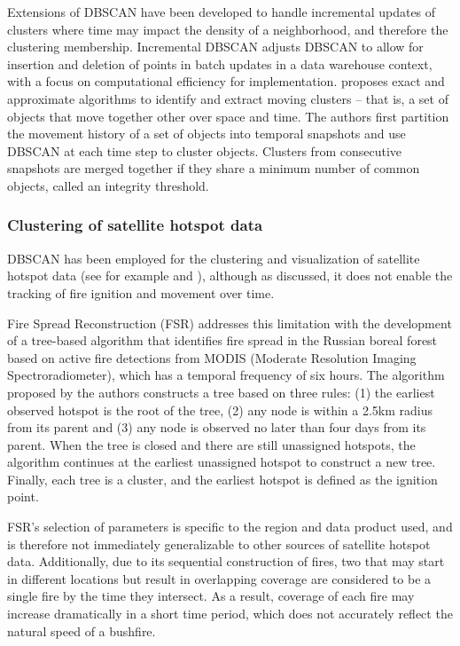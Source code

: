 Extensions of DBSCAN have been developed to handle incremental updates
of clusters where time may impact the density of a neighborhood, and
therefore the clustering membership. Incremental DBSCAN
\citep{ester1998incremental} adjusts DBSCAN to allow for insertion and
deletion of points in batch updates in a data warehouse context, with a
focus on computational efficiency for implementation. \citet{Kalnis2005}
proposes exact and approximate algorithms to identify and extract moving
clusters -- that is, a set of objects that move together other over
space and time. The authors first partition the movement history of a
set of objects into temporal snapshots and use DBSCAN at each time step
to cluster objects. Clusters from consecutive snapshots are merged
together if they share a minimum number of common objects, called an
integrity threshold.

\hypertarget{clustering-of-satellite-hotspot-data}{%
\subsubsection{Clustering of satellite hotspot
data}\label{clustering-of-satellite-hotspot-data}}

DBSCAN has been employed for the clustering and visualization of
satellite hotspot data (see for example \citet{nisa2014} and
\citet{hermawati2016}), although as discussed, it does not enable the
tracking of fire ignition and movement over time.

Fire Spread Reconstruction (FSR) \citep{Loboda2007} addresses this
limitation with the development of a tree-based algorithm that
identifies fire spread in the Russian boreal forest based on active fire
detections from MODIS (Moderate Resolution Imaging Spectroradiometer),
which has a temporal frequency of six hours. The algorithm proposed by
the authors constructs a tree based on three rules: (1) the earliest
observed hotspot is the root of the tree, (2) any node is within a 2.5km
radius from its parent and (3) any node is observed no later than four
days from its parent. When the tree is closed and there are still
unassigned hotspots, the algorithm continues at the earliest unassigned
hotspot to construct a new tree. Finally, each tree is a cluster, and
the earliest hotspot is defined as the ignition point.

FSR's selection of parameters is specific to the region and data product
used, and is therefore not immediately generalizable to other sources of
satellite hotspot data. Additionally, due to its sequential construction
of fires, two that may start in different locations but result in
overlapping coverage are considered to be a single fire by the time they
intersect. As a result, coverage of each fire may increase dramatically
in a short time period, which does not accurately reflect the natural
speed of a bushfire.

